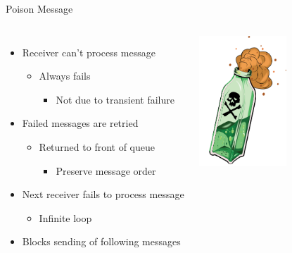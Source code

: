 \documentclass{slide}
\begin{document}
\begin{frame}{Poison Message}
    \begin{columns}[onlytextwidth,T]
      \column{\dimexpr\linewidth-30mm-5mm}
        {\LARGE
        \begin{itemize}
            \item Receiver can't process message
            \begin{itemize}
                \vspace{1mm}
                \Large\item Always fails
                \begin{itemize}
                    \large\item Not due to transient failure
                \end{itemize}
            \end{itemize}
            \vspace{2mm}
            \item Failed messages are retried
            \begin{itemize}
                \vspace{1mm}
                \Large\item Returned to front of queue
                \begin{itemize}
                    \large\item Preserve message order
                \end{itemize}
            \end{itemize}
            \vspace{2mm}
            \item Next receiver fails to process message
            \begin{itemize}
                \vspace{1mm}
                \Large\item Infinite loop
            \end{itemize}
            \vspace{2mm}
            \item Blocks sending of following messages
        \end{itemize}
        }

      \column{30mm}
        \includegraphics[width=33mm]{images/poison-bottle.png}  %
    \end{columns}
\end{frame}
\end{document}
